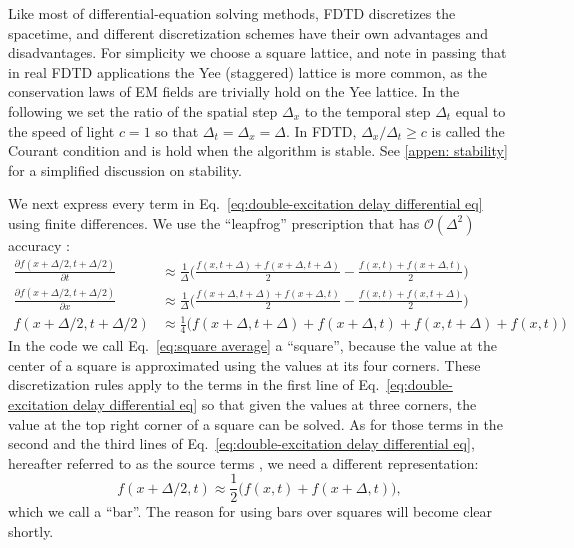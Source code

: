 \documentclass[final,1p,times]{elsarticle}
\begin{document}
Like most of differential-equation solving methods, FDTD discretizes the spacetime, and different discretization schemes have their own advantages and disadvantages. For simplicity we choose a square lattice, and note in passing that in real FDTD applications the Yee (staggered) lattice is more common, as the conservation laws of EM fields are trivially hold on the Yee lattice. In the following we set the ratio of the spatial step $\Delta_x$  to the temporal step $\Delta_t$  equal to the speed of light $c=1$ so that $\Delta_t=\Delta_x=\Delta$. In FDTD, $\Delta_x/\Delta_t\geq c$ is called the Courant condition and is hold when the algorithm is stable. See \ref{appen: stability} for a simplified discussion on stability.

We next express every term in Eq.~\eqref{eq:double-excitation delay differential eq} using finite differences. We use the ``leapfrog'' prescription that has $\mathcal{O}(\Delta^2)$ accuracy \cite{NumericalRecipes}:
\begin{subequations}
\begin{align}
\frac{\partial f(x+\Delta/2,t+\Delta/2)}{\partial t} & \approx\frac{1}{\Delta} \biggl(\frac{f(x,t+\Delta)+f(x+\Delta,t+\Delta)}{2}
-\frac{f(x,t)+f(x+\Delta,t)}{2}\biggr)\\
\frac{\partial f(x+\Delta/2,t+\Delta/2)}{\partial x} &\approx \frac{1}{\Delta} \biggl(\frac{f(x+\Delta,t+\Delta)+f(x+\Delta,t)}{2}
-\frac{f(x,t)+f(x,t+\Delta)}{2} \biggr)\\
f(x+\Delta/2,t+\Delta/2)&\approx \frac{1}{4}\biggl(f(x+\Delta,t+\Delta)+f(x+\Delta,t)
+f(x,t+\Delta)+f(x,t)\biggr)
\end{align}
	\label{eq:square average}
\end{subequations}
In the code we call Eq.~\eqref{eq:square average} a ``square'', because the value at the center of a square is approximated using the values at its four corners. These discretization rules apply to the terms in the first line of Eq.~\eqref{eq:double-excitation delay differential eq} so that given the values at three corners, the value at the top right corner of a square can be solved. As for those terms in the second and the third lines of Eq.~\eqref{eq:double-excitation delay differential eq}, hereafter referred to as the source terms \cite{FangNJP18}, we need a different representation:
\begin{equation}
f(x+\Delta/2,t)\approx \frac{1}{2}\biggl( f(x,t) + f(x+\Delta,t)\biggr), \label{eq:bar average}
\end{equation}
which we call a ``bar''. The reason for using bars over squares will become clear shortly.
\end{document}
